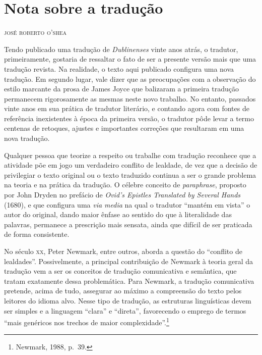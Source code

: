 \chapter{Nota sobre a tradução}

\begin{flushright}
\textsc{josé roberto o’shea}
\end{flushright}
\bigskip

\noindent{}Tendo publicado uma tradução de \textit{Dublinenses} vinte anos atrás, o
tradutor, primeiramente, gostaria de ressaltar o fato de ser a presente versão
mais que uma tradução revista.  Na realidade, o texto aqui publicado configura
uma nova tradução.  Em segundo lugar, vale dizer que as preocupações com a
observação do estilo marcante da prosa de James Joyce que balizaram a primeira
tradução permanecem rigorosamente as mesmas neste novo trabalho.  No entanto,
passados vinte anos em sua prática de tradutor literário, e contando agora com
fontes de referência inexistentes à época da primeira versão, o tradutor pôde
levar a termo centenas de retoques, ajustes e importantes correções que
resultaram em uma nova tradução.

Qualquer pessoa que teorize a respeito ou trabalhe com tradução reconhece que a
atividade põe em jogo um verdadeiro conflito de lealdade, de vez que a decisão
de privilegiar o texto original ou o texto traduzido continua a ser o grande
problema na teoria e na prática da tradução. O célebre conceito de
\textit{paraphrase}, proposto por John Dryden no prefácio de \textit{Ovid’s
Epistles Translated by Several Hands} (1680), e que configura uma \textit{via
media} na qual o tradutor “mantém em vista” o autor do original, dando maior
ênfase ao sentido do que à literalidade das palavras, permanece a prescrição
mais sensata, ainda que difícil de ser praticada de forma consistente.

No século \textsc{xx}, Peter Newmark, entre outros, aborda a questão do
“conflito de lealdades”. Possivelmente, a principal contribuição de Newmark à
teoria geral da tradução vem a ser os conceitos de tradução comunicativa e
semântica, que tratam exatamente dessa problemática. Para Newmark, a tradução
comunicativa pretende, acima de tudo, assegurar ao máximo a compreensão do
texto pelos leitores do idioma alvo. Nesse tipo de tradução, as estruturas
linguísticas devem ser simples e a linguagem “clara” e “direta”, favorecendo o
emprego de termos “mais genéricos nos trechos de maior complexidade”.\footnote{ Newmark,
1988, p.~39.}

